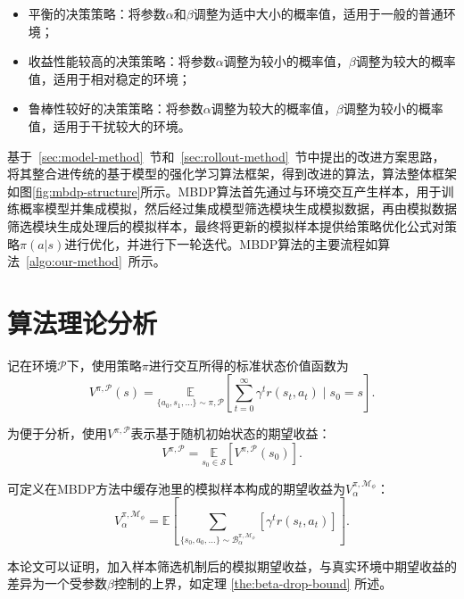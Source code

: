 \begin{itemize}
    \item 平衡的决策策略：将参数$\alpha$和$\beta$调整为适中大小的概率值，适用于一般的普通环境；
    \item 收益性能较高的决策策略：将参数$\alpha$调整为较小的概率值，$\beta$调整为较大的概率值，适用于相对稳定的环境；
    \item 鲁棒性较好的决策策略：将参数$\alpha$调整为较大的概率值，$\beta$调整为较小的概率值，适用于干扰较大的环境。
\end{itemize}

基于~\ref{sec:model-method}~节和~\ref{sec:rollout-method}~节中提出的改进方案思路，将其整合进传统的基于模型的强化学习算法框架，得到改进的算法，算法整体框架如图\ref{fig:mbdp-structure}所示。MBDP算法首先通过与环境交互产生样本，用于训练概率模型并集成模拟，然后经过集成模型筛选模块生成模拟数据，再由模拟数据筛选模块生成处理后的模拟样本，最终将更新的模拟样本提供给策略优化公式对策略$\pi(a|s)$进行优化，并进行下一轮迭代。MBDP算法的主要流程如算法~\ref{algo:our-method}~所示。

\section{算法理论分析}

记在环境$\mathcal{P}$下，使用策略$\pi$进行交互所得的标准状态价值函数为
\begin{equation}\label{def:eta-s}
    {V}^{\pi,\mathcal{P}}(s) = \underset{\{a_0,s_1,\ldots\} \sim \pi,\mathcal{P}}{\mathbb{E}}\left[\sum_{t=0}^\infty\gamma^t r(s_t,a_t)\mid s_0=s\right].
\end{equation}

为便于分析，使用${V}^{\pi,\mathcal{P}}$表示基于随机初始状态的期望收益：
\begin{equation}\label{def:eta-expectation}
    {V}^{\pi,\mathcal{P}} = \underset{s_0\in\mathcal{S}}{\mathbb{E}} \left[{V}^{\pi,\mathcal{P}}(s_0)\right].
\end{equation}

可定义在MBDP方法中缓存池里的模拟样本构成的期望收益为${V}^{\pi,\mathcal{M}_\phi}_\alpha$：
\begin{equation}\label{def:eta-beta}
    {V}^{\pi,\mathcal{M}_\phi}_\alpha=\mathbb{E}\left[{\sum}_{\{s_0,a_0,\ldots\} \sim\mathcal{B}_\alpha^{\pi,\mathcal{M}_\phi}}\left[\gamma^t r(s_t,a_t)\right]\right].
\end{equation}

本论文可以证明，加入样本筛选机制后的模拟期望收益，与真实环境中期望收益的差异为一个受参数$\beta$控制的上界，如定理 \ref{the:beta-drop-bound} 所述。

